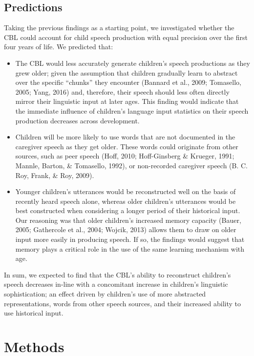 \documentclass[man,mask,floatsintext]{apa6}
\providecommand{\tightlist}{%
  \setlength{\itemsep}{0pt}\setlength{\parskip}{0pt}}
\theoremstyle{definition}
\theoremstyle{definition}
\theoremstyle{definition}
\theoremstyle{remark}
\begin{document}
\subsection{Predictions}\label{predictions}

Taking the previous findings as a starting point, we investigated
whether the CBL could account for child speech production with equal
precision over the first four years of life. We predicted that:

\begin{itemize}
\tightlist
\item
  The CBL would less accurately generate children's speech productions
  as they grew older; given the assumption that children gradually learn
  to abstract over the specific \enquote{chunks} they encounter (Bannard
  et al., 2009; Tomasello, 2005; Yang, 2016) and, therefore, their
  speech should less often directly mirror their linguistic input at
  later ages. This finding would indicate that the immediate influence
  of children's language input statistics on their speech production
  decreases across development.
\item
  Children will be more likely to use words that are not documented in
  the caregiver speech as they get older. These words could originate
  from other sources, such as peer speech (Hoff, 2010; Hoff-Ginsberg \&
  Krueger, 1991; Mannle, Barton, \& Tomasello, 1992), or non-recorded
  caregiver speech (B. C. Roy, Frank, \& Roy, 2009).
\item
  Younger children's utterances would be reconstructed well on the basis
  of recently heard speech alone, whereas older children's utterances
  would be best constructed when considering a longer period of their
  historical input. Our reasoning was that older children's increased
  memory capacity (Bauer, 2005; Gathercole et al., 2004; Wojcik, 2013)
  allows them to draw on older input more easily in producing speech. If
  so, the findings would suggest that memory plays a critical role in
  the use of the same learning mechanism with age.
\end{itemize}

In sum, we expected to find that the CBL's ability to reconstruct
children's speech decreases in-line with a concomitant increase in
children's linguistic sophistication; an effect driven by children's use
of more abstracted representations, words from other speech sources, and
their increased ability to use historical input.

\section{Methods}\label{methods}
\end{document}
